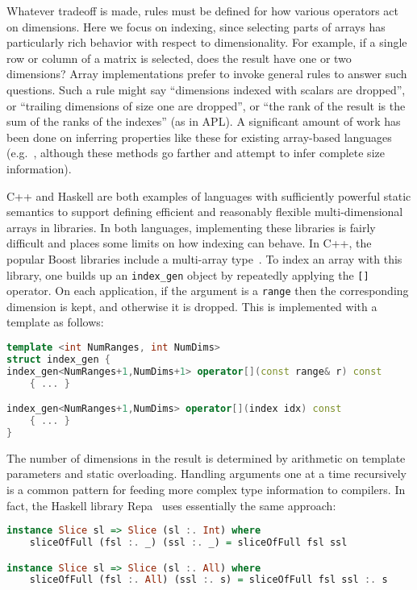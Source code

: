 Whatever tradeoff is made, rules must be defined for how various operators
act on dimensions.
Here we focus on indexing, since selecting parts of arrays has particularly
rich behavior with respect to dimensionality.
For example, if a single row or column of a matrix is
selected, does the result have one or two dimensions?
Array implementations prefer to invoke general rules to answer such questions.
Such a rule might say ``dimensions indexed with scalars are dropped'', or ``trailing
dimensions of size one are dropped'', or ``the rank of the result
is the sum of the ranks of the indexes'' (as in APL).
A significant amount of work has been done on inferring properties like these
for existing array-based languages
(e.g.\ \cite{Joisha:2006:AAS:1152649.1152651,Garg:2014:JSI:2627373.2627382},
although these methods go farther and attempt to infer complete size
information).

C++ and Haskell are both examples of languages with sufficiently powerful
static semantics to support defining efficient and reasonably flexible
multi-dimensional arrays in libraries.
In both languages, implementing these libraries is fairly difficult and
places some limits on how indexing can behave.
In C++, the popular Boost libraries include a multi-array
type~\cite{garcia2005multiarray}.
To index an array with this library, one builds up an \texttt{index\_gen}
object by repeatedly applying the \texttt{[]} operator.
On each application, if the argument is a \texttt{range} then the
corresponding dimension is kept, and otherwise it is dropped.
This is implemented with a template as follows:

\begin{singlespace}
\begin{lstlisting}[language=c++,style=ttcode]
template <int NumRanges, int NumDims>
struct index_gen {
index_gen<NumRanges+1,NumDims+1> operator[](const range& r) const
    { ... }

index_gen<NumRanges+1,NumDims> operator[](index idx) const
    { ... }
}
\end{lstlisting}
\end{singlespace}

\noindent
The number of dimensions in the result is determined by arithmetic
on template parameters and static overloading.
Handling arguments one at a time recursively is a common pattern
for feeding more complex type information to compilers.
In fact, the Haskell library Repa~\cite{Keller:2010rs} uses
essentially the same approach:

\begin{singlespace}
\begin{lstlisting}[language=haskell,style=ttcode]
instance Slice sl => Slice (sl :. Int) where
    sliceOfFull (fsl :. _) (ssl :. _) = sliceOfFull fsl ssl

instance Slice sl => Slice (sl :. All) where
    sliceOfFull (fsl :. All) (ssl :. s) = sliceOfFull fsl ssl :. s
\end{lstlisting}
\end{singlespace}

